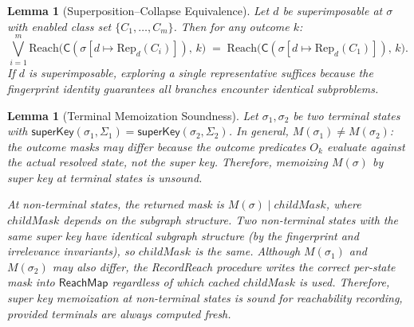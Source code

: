 \documentclass[11pt]{article}
\newtheorem{lemma}[theorem]{Lemma}
\theoremstyle{definition}
\newcommand{\sel}{\sigma}              %
\newcommand{\clean}{\mathsf{C}}        %
\newcommand{\Reach}{\mathrm{Reach}}    %
\newcommand{\Rep}{\mathrm{Rep}}        %
\begin{document}
\begin{lemma}[Superposition--Collapse Equivalence]\label{lem:super-collapse}
Let $d$ be superimposable at $\sel$ with enabled class set
$\{C_1,\dots,C_m\}$. Then for any outcome $k$:
\[
  \bigvee_{i=1}^{m}
  \Reach\bigl(\clean(\sel[d \mapsto \Rep_d(C_i)]),\, k\bigr)
  \;=\;
  \Reach\bigl(\clean(\sel[d \mapsto \Rep_d(C_1)]),\, k\bigr).
\]
If $d$ is superimposable, exploring a single representative suffices
because the fingerprint identity guarantees all branches encounter
identical subproblems.
\end{lemma}

\begin{lemma}[Terminal Memoization Soundness]\label{lem:termmemo}
Let $\sel_1, \sel_2$ be two terminal states with
$\mathsf{superKey}(\sel_1,\Sigma_1) = \mathsf{superKey}(\sel_2,\Sigma_2)$.
In general, $M(\sel_1) \neq M(\sel_2)$: the outcome masks may differ
because the outcome predicates $O_k$ evaluate against the actual resolved
state, not the super key. Therefore, memoizing $M(\sel)$ by super key at
terminal states is unsound.

At non-terminal states, the returned mask is
$M(\sel) \mathbin{|} \mathit{childMask}$, where
$\mathit{childMask}$ depends on the subgraph structure. Two non-terminal
states with the same super key have identical subgraph structure (by the
fingerprint and irrelevance invariants), so $\mathit{childMask}$ is the
same. Although $M(\sel_1)$ and $M(\sel_2)$ may also differ, the
\textsf{RecordReach} procedure writes the correct per-state mask into
$\mathsf{ReachMap}$ regardless of which cached $\mathit{childMask}$ is
used. Therefore, super key memoization at non-terminal states is sound
for reachability recording, provided terminals are always computed fresh.
\end{lemma}
\end{document}
